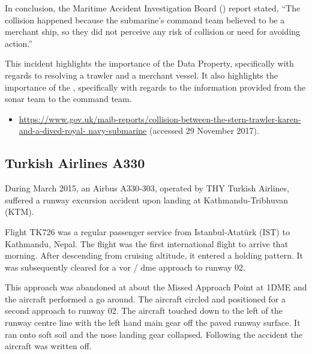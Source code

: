 In conclusion, the Maritime Accident Investigation Board () report stated, ``The collision happened because the submarine's command team believed  to be a merchant ship, so they did not perceive any risk of collision or need for avoiding action.''

This incident highlights the importance of the  Data Property, specifically with regards to resolving a trawler and a merchant vessel. It also highlights the importance of the , specifically with regards to the information provided from the sonar team to the command team. 

\begin{samepage}
\begin{itemize}
  \item \raggedright{\href{https://www.gov.uk/maib-reports/collision-between-the-stern-trawler-karen-and-a-dived-royal-navy-submarine}{https://www.gov.uk/maib-reports/collision-between-the-stern-trawler-karen-and-a-dived-royal- navy-submarine} (accessed 29 November 2017).}
\end{itemize}
\end{samepage}


\subsection{Turkish Airlines A330} \label{bkm:accinc:turkisha330}
During March 2015, an Airbus A330-303, operated by THY Turkish Airlines, suffered a runway excursion accident upon landing at Kathmandu-Tribhuvan (KTM).

Flight TK726 was a regular passenger service from Istanbul-Atat{\"u}rk (IST) to Kathmandu, Nepal. The flight was the first international flight to arrive that morning. After descending from cruising altitude, it entered a holding pattern. It was subsequently cleared for a \gls{vor} / \gls{dme} approach to runway 02. 

This approach was abandoned at about the Missed Approach Point at 1DME and the aircraft performed a go around. The aircraft circled and positioned for a second approach to runway 02. The aircraft touched down to the left of the runway centre line with the left hand main gear off the paved runway surface. It ran onto soft soil and the nose landing gear collapsed. Following the accident the aircraft was written off.

